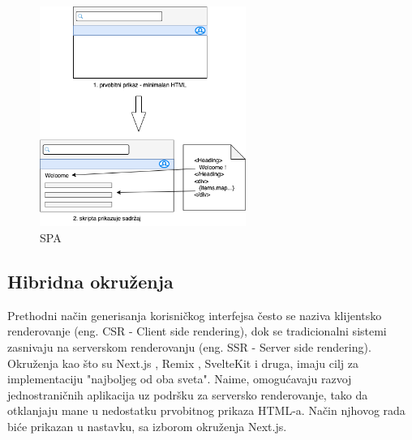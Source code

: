 \documentclass[12pt,oneside]{memoir}
\begin{document}
\begin{figure}[h]
  \centering
  \includegraphics[width=0.6\textwidth]{docs/images/ch_4/frontend-dev-phase2.png} 
  \caption{SPA}
  \label{fig:sample}
\end{figure}

\newpage
\subsection{Hibridna okruženja}

Prethodni način generisanja korisničkog interfejsa često se naziva klijentsko renderovanje (eng. CSR - Client side rendering), dok se tradicionalni sistemi zasnivaju na serverskom renderovanju (eng. SSR - Server side rendering). Okruženja kao što su Next.js \cite{nextjsdocs}, Remix \cite{remixdocs}, SvelteKit \cite{sveltekitdocs} i druga, imaju cilj za implementaciju "najboljeg od oba sveta". Naime, omogućavaju razvoj jednostraničnih aplikacija uz podršku za serversko renderovanje, tako da otklanjaju mane u nedostatku prvobitnog prikaza HTML-a. Način njhovog rada biće prikazan u nastavku, sa izborom okruženja Next.js.

\newpage
\end{document}
